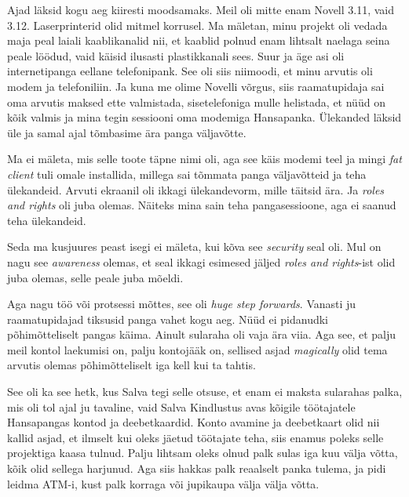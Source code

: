 Ajad läksid kogu aeg kiiresti moodsamaks. Meil oli mitte enam 
Novell 3.11, vaid 3.12. Laserprinterid olid mitmel korrusel. Ma 
mäletan, minu projekt oli vedada maja peal laiali kaablikanalid nii, et kaablid 
polnud enam lihtsalt naelaga seina peale löödud, vaid käisid ilusasti 
plastikkanali sees. Suur ja äge asi oli internetipanga eellane telefonipank. 
See oli siis niimoodi, et minu arvutis oli modem ja telefoniliin. Ja kuna me 
olime  Novelli võrgus, siis raamatupidaja sai oma arvutis maksed ette 
valmistada, sisetelefoniga mulle helistada, et nüüd on kõik valmis ja mina 
tegin  sessiooni oma modemiga Hansapanka. Ülekanded 
läksid üle ja samal ajal tõmbasime ära panga väljavõtte. 


Ma ei mäleta, mis selle toote täpne nimi oli, aga see käis modemi teel ja mingi 
\emph{fat client} tuli omale installida, millega sai tõmmata panga väljavõtteid 
ja teha ülekandeid. Arvuti ekraanil oli ikkagi ülekandevorm, mille täitsid ära. 
Ja \emph{roles and rights} oli juba olemas. Näiteks mina sain teha  
pangasessioone, aga ei saanud teha ülekandeid. 


Seda ma kusjuures peast isegi ei mäleta, kui kõva see \emph{security} seal oli. 
Mul on nagu see \emph{awareness} olemas, et seal ikkagi esimesed jäljed 
\emph{roles and rights}-ist olid juba olemas, selle peale juba mõeldi. 

Aga nagu töö või protsessi mõttes, see oli \emph{huge step forwards}. Vanasti 
ju raamatupidajad tiksusid panga vahet kogu aeg. Nüüd ei pidanudki 
põhimõtteliselt pangas käima. Ainult  sularaha oli vaja ära viia. Aga see, et 
palju meil kontol laekumisi on, palju kontojääk on, sellised asjad 
\emph{magically} olid tema arvutis olemas põhimõtteliselt iga kell kui ta  
tahtis. 

See oli ka see hetk, kus Salva tegi selle otsuse, et enam ei maksta sularahas 
palka, mis oli tol ajal ju tavaline, vaid Salva Kindlustus avas kõigile 
töötajatele Hansapangas kontod ja deebetkaardid. Konto avamine ja deebetkaart 
olid nii kallid asjad, et ilmselt kui oleks jäetud  töötajate teha, siis enamus 
poleks selle projektiga kaasa tulnud. Palju lihtsam oleks olnud palk sulas iga 
kuu välja võtta, kõik olid sellega harjunud. Aga siis hakkas palk reaalselt panka tulema, 
ja pidi leidma ATM-i, kust palk korraga või jupikaupa välja välja võtta. 

